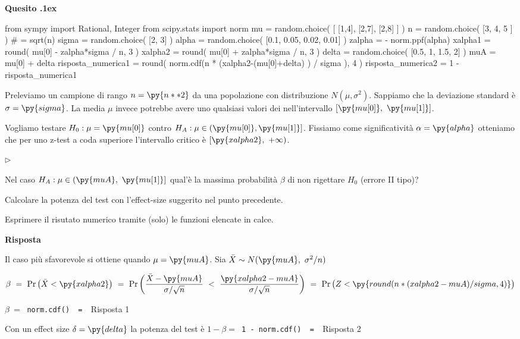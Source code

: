 \documentclass[11pt,twoside,a4paper]{article}
\newcommand{\mylabel}[1]{#1\hfill}
\renewenvironment{itemize}
  {\begin{list}{$\triangleright$}{%
   \setlength{\parskip}{0mm}
   \setlength{\topsep}{.4\baselineskip}
   \setlength{\rightmargin}{0mm}
   \setlength{\listparindent}{0mm}
   \setlength{\itemindent}{0mm}
   \setlength{\labelwidth}{2ex}
   \setlength{\itemsep}{.4\baselineskip}
   \setlength{\parsep}{0mm}
   \setlength{\partopsep}{0mm}
   \setlength{\labelsep}{1ex}
   \setlength{\leftmargin}{\labelwidth+\labelsep}
   \let\makelabel\mylabel}}{%
   \end{list}\vspace*{-1.3mm}}
\def\Pr{{\rm Pr\,}}
\newcounter{quesito}
\newenvironment{question}{\bigskip\addtocounter{quesito}{1}\par\textbf{Quesito \thequesito.\kern1ex}}{\vspace{\parskip}}
\newenvironment{answer}{\par\textbf{Risposta\quad}}{\vspace{\parskip}}
\begin{document}
\begin{question} %
\begin{pycode}
from sympy import Rational, Integer
from scipy.stats import norm
mu = random.choice( [ [1,4], [2,7], [2,8] ] )
n = random.choice( [3, 4, 5 ] ) # = sqrt(n)
sigma = random.choice( [2, 3] )
alpha = random.choice( [0.1, 0.05, 0.02, 0.01] )
zalpha = - norm.ppf(alpha) 
xalpha1 = round( mu[0] - zalpha*sigma / n, 3 )
xalpha2 = round( mu[0] + zalpha*sigma / n, 3 )
delta = random.choice( [0.5, 1, 1.5, 2] )
muA = mu[0] + delta
risposta_numerica1 = round( norm.cdf(n * (xalpha2-(mu[0]+delta) ) / sigma ), 4 )
risposta_numerica2 = 1 - risposta_numerica1
\end{pycode}
Preleviamo un campione di rango $n=\py{n**2}$ da una popolazione con distribuzione $N(\mu,\sigma^2)$. Sappiamo che la deviazione standard è $\sigma=\py{sigma}$. La media $\mu$ invece potrebbe avere uno qualsiasi valori dei nell'intervallo $[\py{mu[0]},\ \py{mu[1]}  ]$.

Vogliamo testare $H_0:\mu=\py{mu[0]}$ contro $H_A:\mu\in (\py{mu[0]},\py{mu[1]}]$. Fissiamo come significatività $\alpha=\py{alpha}$ otteniamo che per uno z-test a coda superiore l'intervallo critico è $[\py{xalpha2}, \ +\infty)$.

\begin{itemize}
\item[1.] Nel caso $H_A:\mu\in (\py{muA},\ \py{mu[1]}]$ qual'è la massima probabilità $\beta$ di non rigettare $H_0$ (errore II tipo)?
\item[2.] Calcolare la potenza del test con l'effect-size suggerito nel punto precedente.
\end{itemize}


Esprimere il risutato numerico tramite (solo) le funzioni elencate in calce.

\begin{answer}

Il caso più sfavorevole si ottiene quando $\mu = \py{muA}$. Sia $\bar X\sim N(\py{muA},\ \sigma^2/n)$

$\beta
\ =\ 
\Pr\big(\bar X < \py{xalpha2} \big)
\ =\ 
\Pr\bigg( \dfrac{\bar X - \py{muA} }{\sigma/\sqrt{n}}\ <\ \dfrac{\py{xalpha2-muA} }{\sigma/\sqrt{n} }\bigg)
\ =\ 
\Pr\big( Z<  \py{round( n * (xalpha2-muA ) / sigma, 4) }\big)$


{\color{blue}$\beta
\ =\ $}
{\color{blue}\tt norm.cdf() }{\tt\ =\  }{\color{blue}\hfill Risposta 1}

\medskip
Con un effect size $\delta=\py{delta}$ la potenza del test è $1-\beta=${\color{blue}\tt\ 1 - norm.cdf() }{\tt\ =\  }{\color{blue}\hfill Risposta 2}

\end{answer}
\end{question}
\end{document}
